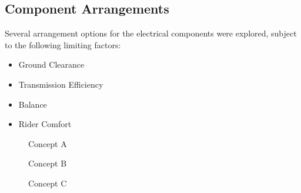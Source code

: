\documentclass[journal,10pt]{IEEEtran}
\begin{document}
    \subsection{Component Arrangements}
        Several arrangement options for the electrical components were explored, subject to the following limiting factors:
        \begin{itemize}
            	\item Ground Clearance
            	\item Transmission Efficiency
            	\item Balance 
            	\item Rider Comfort
            \end{itemize}
        \begin{figure}[H]
                \centering
                \caption{Concept A}
                \label{fig:ConceptA}
            \end{figure} 
        \begin{figure}[H]
                \centering
                \caption{Concept B}
                \label{fig:ConceptB}
            \end{figure}  
        \begin{figure}[H]
                \centering
                \caption{Concept C}
                \label{fig:ConceptC}
            \end{figure} 
\end{document}

